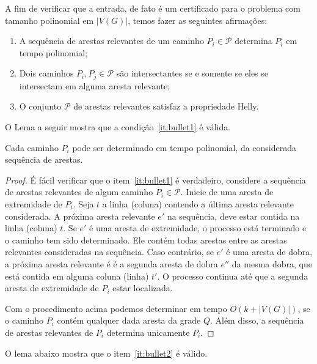A fim de verificar que a entrada, de fato é um certificado para o problema com tamanho polinomial em $|V(G)|$, temos fazer as seguintes afirmações:

\begin{enumerate}[label=(\roman*)]
\item A sequência de arestas relevantes de um caminho $P_i\in \mathcal{P}$ determina $P_i$ em tempo polinomial; \label{it:bullet1}

\item Dois caminhos  $P_i, P_j \in \mathcal{P}$ são intersectantes se e somente se eles se intersectam em alguma aresta relevante; \label{it:bullet2}

\item O conjunto  $\mathcal{P}$ de arestas relevantes satisfaz a propriedade Helly. \label{it:bullet3}
\end{enumerate}

O Lema a seguir mostra que a condição~\ref{it:bullet1} é válida.

\begin{lema}\label{lem:verify1}
Cada caminho $P_i$ pode ser determinado em tempo polinomial, da considerada sequência de arestas.
\end{lema}

\begin{proof}
É fácil verificar que o item~\ref{it:bullet1} é verdadeiro, considere a sequência de arestas relevantes de algum caminho $P_i\in \mathcal{P}$. Inicie de uma aresta de extremidade de $P_i$. Seja   $t$ a linha (coluna) contendo a última aresta relevante considerada. A próxima aresta relevante  $e'$ na sequência, deve estar contida na linha (coluna) $t$. Se $e'$ é uma aresta de extremidade, o processo está terminado e o caminho tem sido determinado. Ele contém todas arestas entre as arestas relevantes consideradas na sequência.  Caso contrário, se  $e'$ é uma aresta de dobra, a próxima aresta relevante é é a segunda aresta de dobra  $e''$ da mesma dobra, que está contida em alguma coluna (linha) $t'$. O processo continua até que a segunda aresta de extremidade de $P_i$ estar localizada.   

Com o procedimento acima podemos determinar em tempo $O(k+|V(G)|)$, se o caminho $P_i$ contém qualquer dada aresta da grade $Q$. Além disso, a sequência de arestas relevantes de  $P_i$ determina unicamente  $P_i$.
 \end{proof} %

O lema abaixo mostra que o item~\ref{it:bullet2} é válido.

